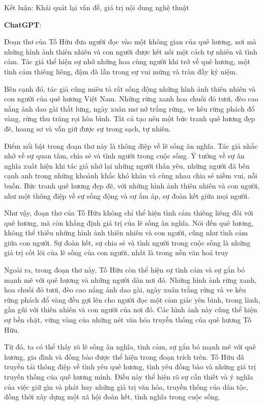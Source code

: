 \documentclass{article}
\begin{document}
{\begin{mdframed}[linewidth=1pt,linecolor=red]
		Kết luận: Khái quát lại vấn đề, giá trị nội dung nghệ thuật
		
		\textbf{ChatGPT}:
		
		Đoạn thơ của Tố Hữu đưa người đọc vào một không gian của quê hương, nơi mà những hình ảnh thiên nhiên và con người được kết nối một cách tự nhiên và tình cảm. Tác giả thể hiện sự nhớ những hoa cùng người khi trở về quê hương, một tình cảm thiêng liêng, đậm đà lẫn trong sự vui mừng và tràn đầy kỷ niệm.
		
		Bên cạnh đó, tác giả cũng miêu tả rất sống động những hình ảnh thiên nhiên và con người của quê hương Việt Nam. Những rừng xanh hoa chuối đỏ tươi, đèo cao nắng ánh dao gài thắt lưng, ngày xuân mơ nở trắng rừng, ve kêu rừng phách đổ vàng, rừng thu trăng rọi hòa bình. Tất cả tạo nên một bức tranh quê hương đẹp đẽ, hoang sơ và vẫn giữ được sự trong sạch, tự nhiên.
		
		Điểm nổi bật trong đoạn thơ này là thông điệp về lẽ sống ân nghĩa. Tác giả nhắc nhở về sự quan tâm, chia sẻ và tình người trong cuộc sống. Ý tưởng về sự ân nghĩa xuất hiện khi tác giả nhớ lại những người thân yêu, những người đã bên cạnh anh trong những khoảnh khắc khó khăn và cùng nhau chia sẻ niềm vui, nỗi buồn. Bức tranh quê hương đẹp đẽ, với những hình ảnh thiên nhiên và con người, như một thông điệp về sự sống động và sự ấm áp, sự đoàn kết giữa mọi người.
		
		Như vậy, đoạn thơ của Tố Hữu không chỉ thể hiện tình cảm thiêng liêng đối với quê hương, mà còn khẳng định giá trị của lẽ sống ân nghĩa. Nói đến quê hương, không thể thiếu những hình ảnh thiên nhiên và con người, cũng như tình cảm giữa con người. Sự đoàn kết, sự chia sẻ và tình người trong cuộc sống là những giá trị cốt lõi của lẽ sống của con người, nhất là trong nền văn hoá truy
		
		Ngoài ra, trong đoạn thơ này, Tố Hữu còn thể hiện sự tình cảm và sự gắn bó mạnh mẽ với quê hương và những người dân nơi đó. Những hình ảnh rừng xanh, hoa chuối đỏ tươi, đèo cao nắng ánh dao gài, ngày xuân trắng rừng và ve kêu rừng phách đổ vàng đều gợi lên cho người đọc một cảm giác yên bình, trong lành, gần gũi với thiên nhiên và con người của nơi đó. Các hình ảnh này cũng thể hiện sự bền chặt, vững vàng của những nét văn hóa truyền thống của quê hương Tố Hữu.
		
		Từ đó, ta có thể thấy rõ lẽ sống ân nghĩa, tình cảm, sự gắn bó mạnh mẽ với quê hương, gia đình và đồng bào được thể hiện trong đoạn trích trên. Tố Hữu đã truyền tải thông điệp về tình yêu quê hương, tình yêu đồng bào và những giá trị truyền thống của quê hương mình. Điều này thể hiện rõ sự cần thiết và ý nghĩa của việc giữ gìn và phát huy những giá trị văn hóa, truyền thống của dân tộc, đồng thời xây dựng một xã hội đoàn kết, tình nghĩa trong cuộc sống.
		

\end{mdframed}}
\end{document}
